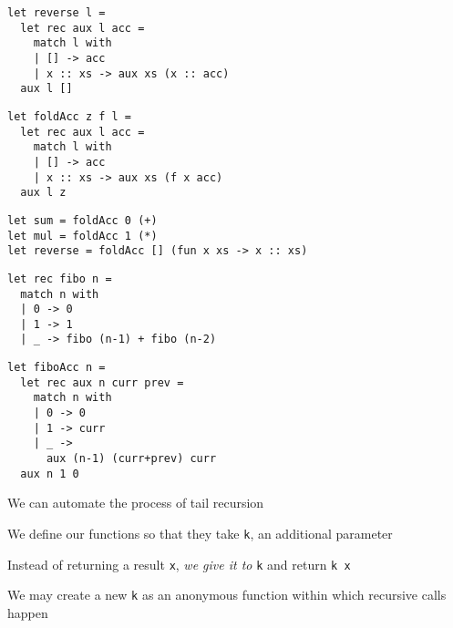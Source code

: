\documentclass{beamer}
\begin{document}
\begin{frame}[fragile]
\begin{lstlisting}
let reverse l = 
  let rec aux l acc = 
    match l with
    | [] -> acc
    | x :: xs -> aux xs (x :: acc)
  aux l []
\end{lstlisting}
\end{frame}

\begin{frame}[fragile]
\begin{lstlisting}
let foldAcc z f l = 
  let rec aux l acc = 
    match l with
    | [] -> acc
    | x :: xs -> aux xs (f x acc)
  aux l z
\end{lstlisting}
\end{frame}

\begin{frame}[fragile]
\begin{lstlisting}
let sum = foldAcc 0 (+)
let mul = foldAcc 1 (*)
let reverse = foldAcc [] (fun x xs -> x :: xs)
\end{lstlisting}
\end{frame}

\begin{frame}[fragile]
\begin{lstlisting}
let rec fibo n =
  match n with
  | 0 -> 0
  | 1 -> 1
  | _ -> fibo (n-1) + fibo (n-2)
\end{lstlisting}
\end{frame}

\begin{frame}[fragile]
\begin{lstlisting}
let fiboAcc n =
  let rec aux n curr prev =
    match n with
    | 0 -> 0
    | 1 -> curr
    | _ -> 
      aux (n-1) (curr+prev) curr
  aux n 1 0
\end{lstlisting}
\end{frame}

\begin{slide}{
\item We can automate the process of tail recursion
\item We define our functions so that they take \texttt{k}, an additional parameter
\item Instead of returning a result \texttt{x}, \textit{we give it to} \texttt{k} and return \texttt{k x}
\item We may create a new \texttt{k} as an anonymous function within which recursive calls happen
}\end{slide}
\end{document}
